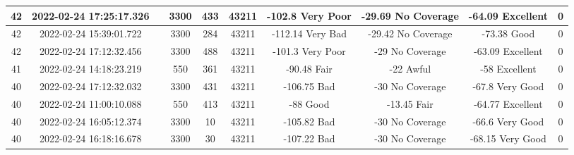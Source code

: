 \begin{longtable*}{|c|c|c|c|c|c|c|c|c|c|}
42&2022-02-24 17:25:17.326&&3300&433&43211& -102.8    Very Poor   & -29.69    No Coverage & -64.09    Excellent   & 0\\\hline
{}42&2022-02-24 15:39:01.722&&3300&284&43211& -112.14   Very Bad    & -29.42    No Coverage & -73.38    Good        & 0\\\hline
{}42&2022-02-24 17:12:32.456&&3300&488&43211& -101.3    Very Poor   & -29       No Coverage & -63.09    Excellent   & 0\\\hline
{}41&2022-02-24 14:18:23.219&&550&361&43211& -90.48    Fair        & -22       Awful       & -58       Excellent   & 0\\\hline
{}40&2022-02-24 17:12:32.032&&3300&431&43211& -106.75   Bad         & -30       No Coverage & -67.8     Very Good   & 0\\\hline
{}40&2022-02-24 11:00:10.088&&550&413&43211& -88       Good        & -13.45    Fair        & -64.77    Excellent   & 0\\\hline
{}40&2022-02-24 16:05:12.374&&3300&10&43211& -105.82   Bad         & -30       No Coverage & -66.6     Very Good   & 0\\\hline
{}40&2022-02-24 16:18:16.678&&3300&30&43211& -107.22   Bad         & -30       No Coverage & -68.15    Very Good   & 0\\\hline

\end{longtable*}

